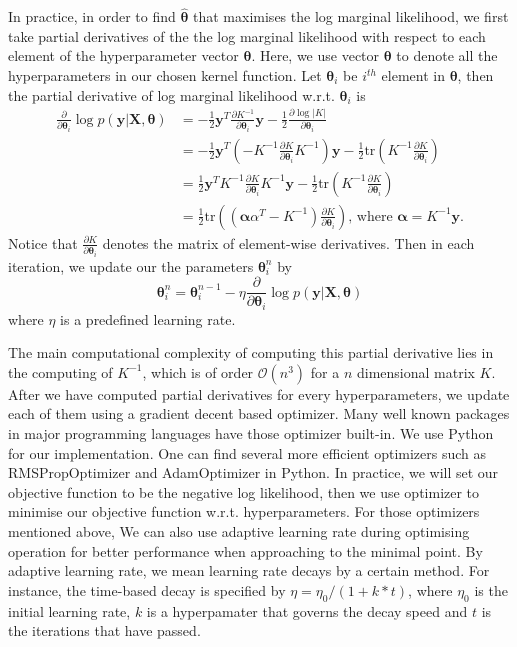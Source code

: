 \documentclass[11pt,a4paper]{article}
\theoremstyle{definition}
\numberwithin{equation}{section}
\let\vec\mathbf
\begin{document}
In practice, in order to find $\vec{\hat \theta}$ that maximises the log marginal likelihood, we first take partial derivatives of the the log marginal likelihood with respect to each element of the hyperparameter vector $\vec \theta$. Here, we use vector $\vec \theta$ to denote all the hyperparameters in our chosen kernel function.  Let $\vec \theta_i$ be $i^{th}$ element in $\vec \theta$, then the partial derivative of log marginal likelihood w.r.t. $\vec \theta_i$ is 
\begin{equation}
\begin{split}
\frac{\partial}{\partial \vec \theta_i}\log p(\vec y|\vec X, \vec \theta) & = -\frac{1}{2}\vec y^T \frac{\partial K^{-1}}{\partial \vec \theta_i}\vec y-\frac{1}{2}\frac{\partial \log|K|}{\partial \vec \theta_i}\\
& = -\frac{1}{2}\vec y^T\left(  -K^{-1} \frac{\partial K}{\partial \vec \theta_i} K^{-1} \right)\vec y - \frac{1}{2}\text{tr} \left(K^{-1}\frac{\partial K}{\partial\vec \theta_i}\right)\\
&= \frac{1}{2}\vec y^TK^{-1} \frac{\partial K}{\partial \vec \theta_i} K^{-1} \vec y - \frac{1}{2}\text{tr} \left(K^{-1}\frac{\partial K}{\partial\vec \theta_i}\right)\\
& = \frac{1}{2}\text{tr} \left( (\vec \alpha\alpha^T - K^{-1})\frac{\partial K}{\partial\vec \theta_i}\right) \text{, where } \vec \alpha = K^{-1} \vec y.
\end{split}
\end{equation}
Notice that $\frac{\partial K}{\partial\vec \theta_i}$ denotes the matrix of element-wise derivatives. Then in each iteration, we update our the parameters $\vec\theta^n_i$ by
\begin{equation}
\vec\theta^n_i = \vec\theta^{n-1}_i - \eta\frac{\partial}{\partial \vec \theta_i}\log p(\vec y|\vec X, \vec \theta) 
\end{equation}
where $\eta$ is a predefined learning rate. 

The main computational complexity of computing this partial derivative lies in the computing of $K^{-1}$, which is of order $\mathcal O(n^3)$ for a $n$ dimensional matrix $K$. After we have computed partial derivatives for every hyperparameters, we update each of them using a gradient decent based optimizer. Many well known packages in major programming languages have those optimizer built-in. We use Python for our implementation. One can find several more efficient optimizers such as RMSPropOptimizer and AdamOptimizer in Python. In practice, we will set our objective function to be the negative log likelihood, then we use optimizer to minimise our objective function w.r.t. hyperparameters. For those optimizers mentioned above, We can also use adaptive learning rate during optimising operation for better performance when approaching to the minimal point. By adaptive learning rate, we mean learning rate decays by a certain method. For instance, the time-based decay is specified by $\eta = \eta_0/(1+k*t)$, where $\eta_0$ is the initial learning rate, $k$ is a hyperpamater that governs the decay speed and $t$ is the iterations that have passed\cite[Bengio]{Bengio}.
\end{document}
